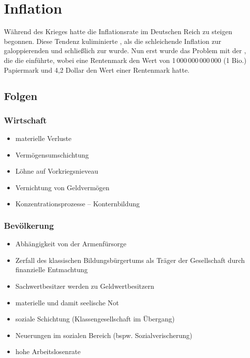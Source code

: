 \section{Inflation}
\label{sec:soz-veraend}

Während des Krieges hatte die Inflationsrate im Deutschen Reich zu
steigen begonnen. Diese Tendenz kuliminierte , als die
schleichende Inflation zur galoppierenden und schließlich zur
 wurde. Nun erst wurde das Problem mit der
, die die 
einführte, wobei eine Rentenmark den Wert von 1\,000\,000\,000\,000 (1
Bio.) Papiermark und 4,2 Dollar den Wert einer Rentenmark
hatte.

\subsection*{Folgen}

\subsubsection{Wirtschaft}

\begin{itemize}
\item materielle Verluste
\item Vermögensumschichtung
\item Löhne auf Vorkriegsnieveau
\item Vernichtung von Geldvermögen
\item Konzentrationsprozesse -- Konternbildung 
\end{itemize}


\subsubsection{Bevölkerung}

\begin{itemize}
\item Abhängigkeit von der Armenfürsorge
\item Zerfall des klassischen Bildungsbürgertums als Träger der
Gesellschaft durch finanzielle Entmachtung
\item Sachwertbesitzer werden zu Geldwertbesitzern
\item materielle und damit seelische Not
\item soziale Schichtung (Klassengesellschaft im Übergang)
\item Neuerungen im sozialen Bereich (bspw. Sozialverischerung) 
\item hohe Arbeitslosenrate
\end{itemize}


